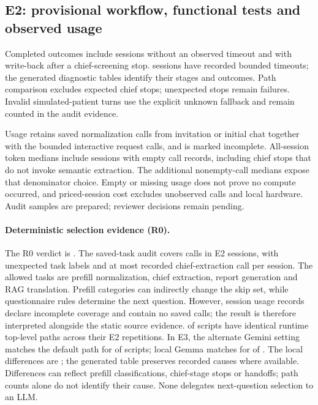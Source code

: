 \subsection{E2: provisional workflow, functional tests and observed usage}





Completed outcomes include \ETwoTimeoutFreeCompleted{} sessions without an
observed timeout and \ETwoChiefStopsCompleted{} with write-back after a
chief-screening stop. \ETwoTimeoutSessions{} sessions have recorded bounded
timeouts; the generated diagnostic tables identify their stages and outcomes. Path comparison excludes expected
chief stops; unexpected stops remain failures. Invalid simulated-patient turns use
the explicit unknown fallback and remain counted in the audit evidence.

Usage retains saved normalization calls from invitation or initial chat together
with the bounded interactive request calls, and is marked incomplete.
All-session token medians include sessions with empty call records, including
chief stops that do not invoke semantic extraction. The additional nonempty-call
medians expose that denominator choice. Empty or missing usage does not prove no
compute occurred, and priced-session cost excludes unobserved calls and local
hardware. Audit samples are prepared; reviewer decisions remain pending.

\paragraph{Deterministic selection evidence (R0).}
The R0 verdict is \RZeroVerdict{}. The saved-task audit covers
\ETwoDetCalls{} calls in \ETwoDetSessions{} E2 sessions, with
\ETwoDetUnexpectedTasks{} unexpected task labels and at most
\ETwoDetChiefMax{} recorded chief-extraction call per session. The allowed
tasks are prefill normalization, chief extraction, report generation and RAG
translation. Prefill categories can indirectly change the skip set, while
questionnaire rules determine the next question. However, \ETwoDetUsageIncomplete{} session usage
records declare incomplete coverage and \ETwoDetEmptyUsage{} contain no saved
calls; the result is therefore interpreted alongside the static source evidence.
\RZeroStableScripts{} of \RZeroScripts{} scripts have identical runtime
top-level paths across their \RZeroRepeats{} E2 repetitions. In E3, the alternate
Gemini setting matches the default path for \EThreeAlternateDetSamePaths{} of
\EThreeAlternateDetComparedScripts{} scripts; local Gemma matches for
\EThreeLocalDetSamePaths{} of \EThreeLocalDetComparedScripts{}. The local
differences are \EThreeLocalDetDifferentScripts{}; the generated table preserves recorded causes where available. Differences can
reflect prefill classifications, chief-stage stops or handoffs; path counts alone
do not identify their cause. None delegates next-question selection to an LLM.

